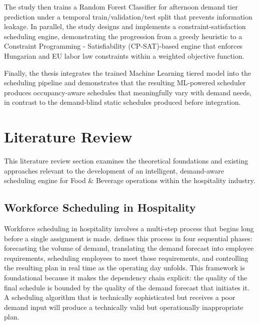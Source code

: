 \documentclass[12pt,a4paper,oneside]{article}
\begin{document}
The study then trains a Random Forest Classifier for afternoon demand tier prediction under a temporal train/validation/test split that prevents information leakage. In parallel, the study designs and implements a constraint-satisfaction scheduling engine, demonstrating the progression from a greedy heuristic to a Constraint Programming - Satisfiability (CP-SAT)-based engine that enforces Hungarian and EU labor law constraints within a weighted objective function.

Finally, the thesis integrates the trained Machine Learning tiered model into the scheduling pipeline and demonstrates that the resulting ML-powered scheduler produces occupancy-aware schedules that meaningfully vary with demand needs, in contrast to the demand-blind static schedules produced before integration.


\newpage

\section{Literature Review}
\label{sec:literature}

This literature review section examines the theoretical foundations and existing approaches relevant to the development of an intelligent, demand-aware scheduling engine for Food \& Beverage operations within the hospitality industry.

\subsection{Workforce Scheduling in Hospitality}

Workforce scheduling in hospitality involves a multi-step process that begins long before a single assignment is made. \citet{thompson2004} defines this process in four sequential phases: forecasting the volume of demand, translating the demand forecast into employee requirements, scheduling employees to meet those requirements, and controlling the resulting plan in real time as the operating day unfolds. This framework is foundational because it makes the dependency chain explicit: the quality of the final schedule is bounded by the quality of the demand forecast that initiates it. A scheduling algorithm that is technically sophisticated but receives a poor demand input will produce a technically valid but operationally inappropriate plan.
\end{document}
